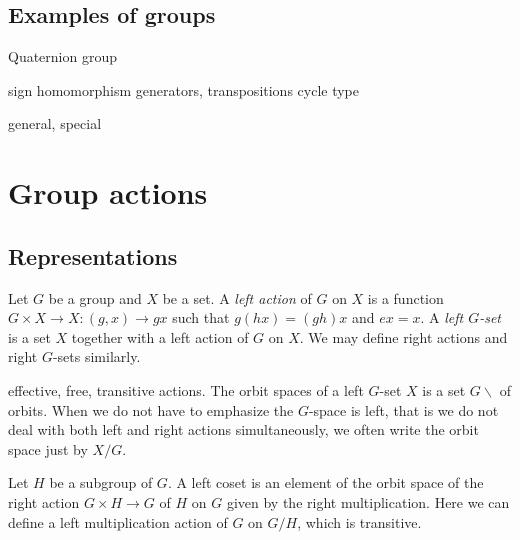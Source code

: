 \documentclass{../../large}
\begin{document}
\section{Examples of groups}
\begin{prb}
\end{prb}
\begin{prb}
\end{prb}
\begin{prb}
Quaternion group
\end{prb}
\begin{prb}
sign homomorphism
generators, transpositions
cycle type
\end{prb}
\begin{prb}
general, special
\end{prb}






\chapter{Group actions}

\section{Representations}

Let $G$ be a group and $X$ be a set.
A \emph{left action} of $G$ on $X$ is a function $G\times X\to X:(g,x)\to gx$ such that $g(hx)=(gh)x$ and $ex=x$.
A \emph{left $G$-set} is a set $X$ together with a left action of $G$ on $X$.
We may define right actions and right $G$-sets similarly.

effective, free, transitive actions.
The orbit spaces of a left $G$-set $X$ is a set $G\backslash$ of orbits.
When we do not have to emphasize the $G$-space is left, that is we do not deal with both left and right actions simultaneously, we often write the orbit space just by $X/G$.

Let $H$ be a subgroup of $G$.
A left coset is an element of the orbit space of the right action $G\times H\to G$ of $H$ on $G$ given by the right multiplication.
Here we can define a left multiplication action of $G$ on $G/H$, which is transitive.



\begin{prb}
\end{prb}
\end{document}
